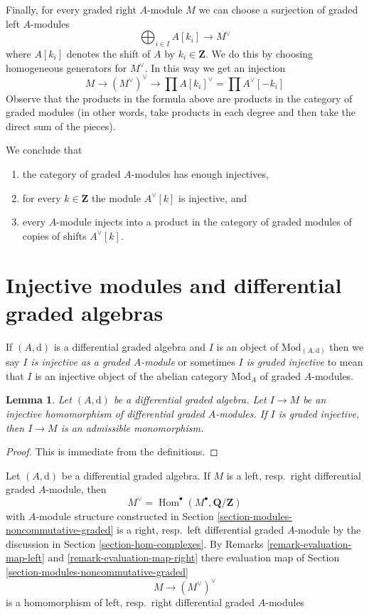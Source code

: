 \documentclass{stacks-project}
\theoremstyle{plain}
\newtheorem{lemma}[subsection]{Lemma}
\theoremstyle{definition}
\theoremstyle{remark}
\numberwithin{equation}{subsection}
\def\Hom{\mathop{\mathrm{Hom}}\nolimits}
\begin{document}
\medskip\noindent
Finally, for every graded right $A$-module $M$ we can choose a surjection
of graded left $A$-modules
$$
\bigoplus\nolimits_{i \in I} A[k_i] \to M^\vee
$$
where $A[k_i]$ denotes the shift of $A$ by $k_i \in \mathbf{Z}$.
We do this by choosing homogeneous generators for $M^\vee$.
In this way we get an injection
$$
M \to (M^\vee)^\vee \to \prod A[k_i]^\vee = \prod A^\vee[-k_i]
$$
Observe that the products in the formula above are products in the
category of graded modules (in other words, take products in each degree
and then take the direct sum of the pieces).

\medskip\noindent
We conclude that
\begin{enumerate}
\item the category of graded $A$-modules has enough injectives,
\item for every $k \in \mathbf{Z}$ the module $A^\vee[k]$ is injective, and
\item every $A$-module injects into a product in the category of graded
modules of copies of shifts $A^\vee[k]$.
\end{enumerate}





\section{Injective modules and differential graded algebras}
\label{section-modules-noncommutative-differential-graded}

\noindent
If $(A, \text{d})$ is a differential graded algebra and $I$ is
an object of $\text{Mod}_{(A, \text{d})}$ then we say
{\it $I$ is injective as a graded $A$-module} or sometimes
{\it $I$ is graded injective} to mean
that $I$ is an injective object of the abelian category $\text{Mod}_A$
of graded $A$-modules.

\begin{lemma}
\label{lemma-source-graded-injective}
Let $(A, \text{d})$ be a differential graded algebra.
Let $I \to M$ be an injective homomorphism of differential graded
$A$-modules. If $I$ is graded injective, then
$I \to M$ is an admissible monomorphism.
\end{lemma}

\begin{proof}
This is immediate from the definitions.
\end{proof}

\noindent
Let $(A, \text{d})$ be a differential graded algebra. If $M$ is a
left, resp.\ right differential graded $A$-module, then
$$
M^\vee = \Hom^\bullet(M^\bullet, \mathbf{Q}/\mathbf{Z})
$$
with $A$-module structure constructed in
Section \ref{section-modules-noncommutative-graded} is a
right, resp.\ left differential graded $A$-module by the
discussion in Section \ref{section-hom-complexes}.
By Remarks
\ref{remark-evaluation-map-left} and \ref{remark-evaluation-map-right}
there evaluation map of Section \ref{section-modules-noncommutative-graded}
$$
M \longrightarrow (M^\vee)^\vee
$$
is a homomorphism of left, resp.\ right differential graded $A$-modules
\end{document}
